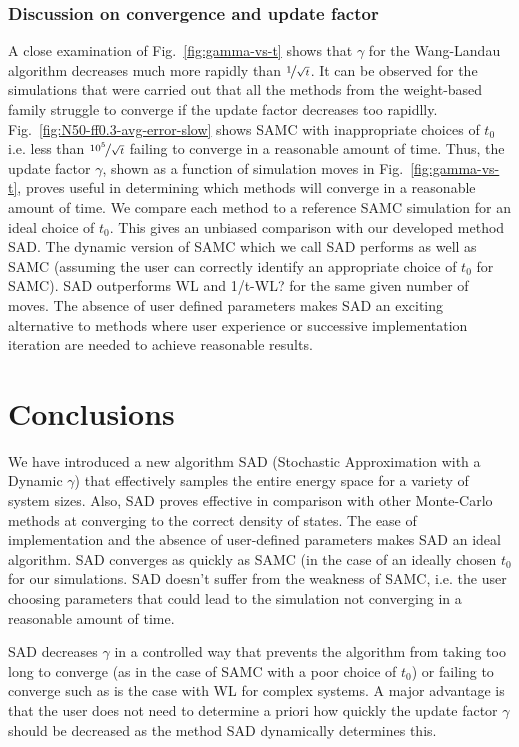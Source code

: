 \documentclass[letterpaper,twocolumn,amsmath,amssymb,pre,aps,10pt]{revtex4-1}
\begin{document}
\subsubsection{Discussion on convergence and update factor}

A close examination of Fig.~\ref{fig:gamma-vs-t} shows that $\gamma$
for the Wang-Landau algorithm decreases much more rapidly than
$\nicefrac{1}{\sqrt{t}}$. It can be observed  for the simulations that
were carried out that all the methods from the weight-based family
struggle to converge if the update factor decreases too rapidlly.
Fig.~\ref{fig:N50-ff0.3-avg-error-slow} shows SAMC with inappropriate choices
of $t_0$ i.e. less than $\nicefrac{10^5}{\sqrt{t}}$ failing to converge
in a reasonable amount of time. Thus, the update factor $\gamma$, shown
as a function of simulation moves in Fig.~\ref{fig:gamma-vs-t}, proves
useful in determining which methods will converge in a reasonable
amount of time. We compare each method to a reference SAMC
simulation for an ideal choice of $t_0$.  This gives an unbiased
comparison with our developed method SAD. The dynamic version of SAMC
which we call SAD performs as well as SAMC (assuming the user can
correctly identify an appropriate choice of $t_0$ for SAMC).  SAD
outperforms WL and 1/t-WL? for the same given number of moves. The
absence of user defined parameters makes SAD an exciting alternative to
methods where user experience or successive implementation iteration
are needed to achieve reasonable results.

\section{Conclusions}

We have introduced a new algorithm SAD (Stochastic Approximation with a
Dynamic $\gamma$) that effectively samples the entire energy space for
a variety of system sizes.  Also, SAD proves effective in comparison
with other Monte-Carlo methods at converging to the correct density of
states.  The ease of implementation and the absence of user-defined
parameters makes SAD an ideal algorithm. SAD converges as quickly as
SAMC (in the case of an ideally chosen $t_0$ for our simulations. SAD
doesn't suffer from the weakness of SAMC, i.e. the user choosing
parameters that could lead to the simulation not converging in a
reasonable amount of time.

SAD decreases $\gamma$ in a controlled way that prevents the algorithm
from taking too long to converge (as in the case of SAMC with a poor choice
of $t_0$) or failing to converge such as is the case with WL for complex
systems. A major advantage is that the user does not need to determine a
priori how quickly the update factor $\gamma$ should be decreased as the
method SAD dynamically determines this.
\end{document}

